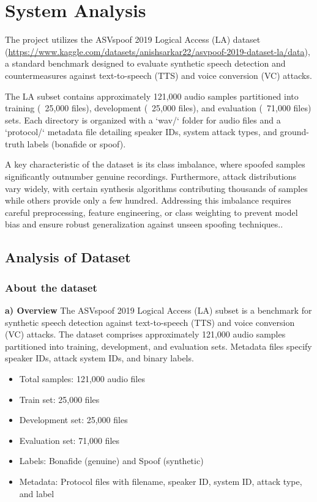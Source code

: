 \documentclass[12pt,a4paper]{report}
\begin{document}
\chapter{System Analysis}
The project utilizes the ASVspoof 2019 Logical Access (LA) dataset (\url{https://www.kaggle.com/datasets/anishsarkar22/asvpoof-2019-dataset-la/data}), a standard benchmark designed to evaluate synthetic speech detection and countermeasures against text-to-speech (TTS) and voice conversion (VC) attacks. 

The LA subset contains approximately 121,000 audio samples partitioned into training (~25,000 files), development (~25,000 files), and evaluation (~71,000 files) sets. Each directory is organized with a `wav/` folder for audio files and a `protocol/` metadata file detailing speaker IDs, system attack types, and ground-truth labels (bonafide or spoof). 

A key characteristic of the dataset is its class imbalance, where spoofed samples significantly outnumber genuine recordings. Furthermore, attack distributions vary widely, with certain synthesis algorithms contributing thousands of samples while others provide only a few hundred. Addressing this imbalance requires careful preprocessing, feature engineering, or class weighting to prevent model bias and ensure robust generalization against unseen spoofing techniques..

\section{Analysis of Dataset}
\subsection{About the dataset}

\textbf{a) Overview}
\newline
The ASVspoof 2019 Logical Access (LA) subset is a benchmark for synthetic speech detection against text-to-speech (TTS) and voice conversion (VC) attacks. The dataset comprises approximately 121,000 audio samples partitioned into training, development, and evaluation sets. Metadata files specify speaker IDs, attack system IDs, and binary labels.

\begin{itemize}[itemsep=2pt, topsep=2pt]
    \item Total samples: 121,000 audio files
    \item Train set: 25,000 files
    \item Development set: 25,000 files
    \item Evaluation set: 71,000 files
    \item Labels: Bonafide (genuine) and Spoof (synthetic)
    \item Metadata: Protocol files with filename, speaker ID, system ID, attack type, and label
\end{itemize}
\end{document}
